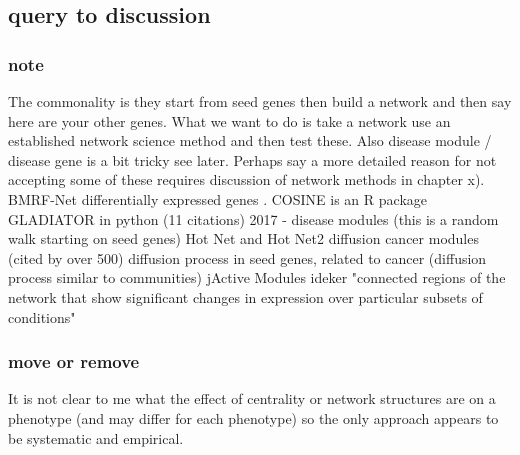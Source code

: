 \subsection{query to discussion}
\subsubsection{note}
The commonality is they start from seed genes then build a network and then say here are your other genes. What we want to do is take a network use an established network science method and then test these. Also disease module / disease gene is a bit tricky see later. Perhaps say a more detailed reason for not accepting some of these requires discussion of network methods in chapter x). 
BMRF-Net differentially expressed genes \cite{shi2015bmrf}.     COSINE is an R package \cite{ma2011cosine} GLADIATOR \cite{silberberg2017gladiator} in python (11 citations) 2017 - disease modules (this is a random walk starting on seed genes) Hot Net and Hot Net2 diffusion cancer modules \cite{leiserson2015pan} (cited by over 500) diffusion process in seed genes, related to cancer (diffusion process similar to communities) jActive Modules ideker "connected regions of the network that show significant changes in expression over particular subsets of conditions" 

\subsubsection{move or remove}
It is not clear to me what the effect of centrality or network structures are on a phenotype (and may differ for each phenotype) so the only approach appears to be systematic and empirical. 



